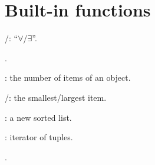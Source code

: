 \section{Built-in functions}
\begin{compactitem}
	\item {}/: ``$\forall$/$\exists$''.
	\item {}.
	\item {}: the number of items of an object.
	\item {}/: the smallest/largest item.
	\item {}
	\item {}: a new sorted list.
	\item {}: iterator of tuples.
	\item {}.
\end{compactitem}
